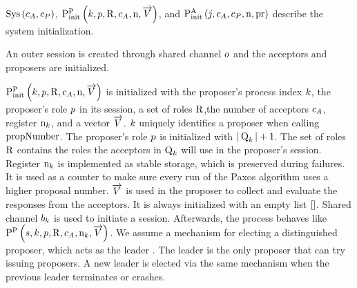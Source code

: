 $\operatorname{Sys}\left(c_A, c_P\right)$, $\textstyle\operatorname{P^{P}_{init}}\left(
    k,
    p,
    \operatorname{R},
    c_A,
    \operatorname{n},
    \overrightarrow{V}
\right)$, and $\operatorname{P^{A}_{init}}\left(
    j,
    c_A,
    c_P,
    \operatorname{n},
    \operatorname{pr}
\right)$ describe the system initialization.

An outer session is created through shared channel $o$ and the acceptors and proposers are initialized.

$\textstyle\operatorname{P^{P}_{init}}\left(
    k,
    p,
    \operatorname{R},
    c_A,
    \operatorname{n},
    \overrightarrow{V}
\right)$ is initialized with the proposer's process index $k$, the proposer's role $p$ in its session, a set of roles $\operatorname{R}$,the number of acceptors $c_A$, register $\operatorname{n}_{k}$, and a vector $\overrightarrow{V}$.
$k$ uniquely identifies a proposer when calling $\operatorname{propNumber}$.
The proposer's role $p$ is initialized with $|\operatorname{Q}_{k}| + 1$.
The set of roles $\operatorname{R}$ contains the roles the acceptors in $\operatorname{Q}_{k}$ will use in the proposer's session.
Register $\operatorname{n}_{k}$ is implemented as stable storage, which is preserved during failures.
It is used as a counter to make sure every run of the Paxos algorithm uses a higher proposal number.
$\overrightarrow{V}$ is used in the proposer to collect and evaluate the responses from the acceptors.
It is always initialized with an empty list $\mathtt{[]}$.
Shared channel $b_{k}$ is used to initiate a session.
Afterwards, the process behaves like $\operatorname{P^{P}_{}}\left(
    s,
    k,
    p,
    \operatorname{R},
    c_A,
    \operatorname{n}_{k},
    \overrightarrow{V}
\right)$.
We assume a mechanism for electing a distinguished proposer, which acts as the leader \cite{Lamport01}.
The leader is the only proposer that can try issuing proposers.
A new leader is elected via the same mechanism when the previous leader terminates or crashes.

